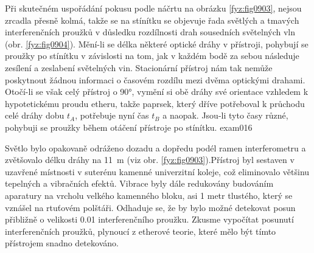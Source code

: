 \begin{fyzexam}{Při skutečném uspořádání pokusu podle náčrtu na obrázku \ref{fyz:fig0903}, nejsou
  zrcadla přesně kolmá, takže se na stínítku se objevuje řada světlých a tmavých interferenčních
  proužků v důsledku rozdílnosti drah sousedních světelných vln (obr. \ref{fyz:fig0904}). Mění-li se
  délka některé optické dráhy v přístroji, pohybují se proužky po stínítku v závislosti na tom, jak
  v každém bodě za sebou následuje zesílení a zeslabení světelných vin. Stacionární přístroj nám tak
  nemůže poskytnout žádnou informaci o časovém rozdílu mezi dvěma optickými drahami. Otočí-li se
  však celý přístroj o \ang{90}, vymění si obě dráhy své orientace vzhledem k hypotetickému proudu
  etheru, takže paprsek, který dříve potřeboval k průchodu celé dráhy dobu \(t_A\), potřebuje nyní
  čas \(t_B\) a naopak. Jsou-li tyto časy různé, pohybuji se proužky během otáčení přístroje po
  stínítku.  \hfill\cite[s.~18]{Beiser1975}}{exam016} 

  {\centering
  \captionsetup{type=figure}
  \par}
  \vspace{1em}

  Světlo bylo opakovaně odráženo dozadu a dopředu podél ramen interferometru a zvětšovalo délku
  dráhy na \qty{11}{\metre} (viz obr. \ref{fyz:fig0903}).Přístroj byl sestaven v uzavřené místnosti v
  suterénu kamenné univerzitní koleje, což eliminovalo většinu tepelných a vibračních efektů.
  Vibrace byly dále redukovány budováním aparatury na vrcholu velkého kamenného bloku, asi 1 metr
  tlustého, který se vznášel na rtuťovém polštáři. Odhaduje se, že by bylo možné detekovat posun
  přibližně o velikosti \num{0.01} interferenčního proužku. Zkusme vypočítat posunutí
  interferenčních proužků, plynoucí z etherové teorie, které mělo být tímto přístrojem snadno
  detekováno. 

  {\centering
  \captionsetup{type=figure}
   \par}
  \vspace{1em}


\end{fyzexam}
